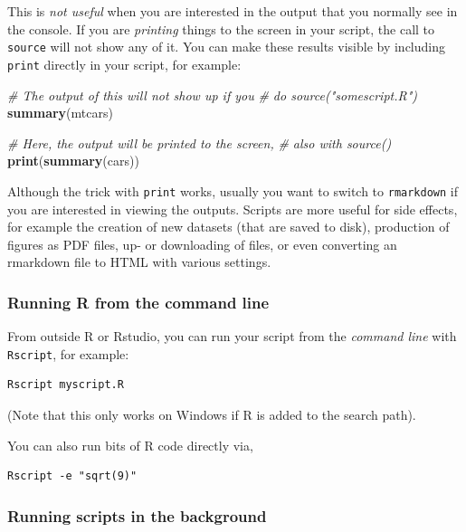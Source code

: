 \documentclass[]{book}
\newenvironment{Shaded}{\begin{snugshade}}{\end{snugshade}}
\newcommand{\CommentTok}[1]{\textcolor[rgb]{0.56,0.35,0.01}{\textit{#1}}}
\newcommand{\KeywordTok}[1]{\textcolor[rgb]{0.13,0.29,0.53}{\textbf{#1}}}
\newcommand{\NormalTok}[1]{#1}
\begin{document}
This is \emph{not useful} when you are interested in the output that you normally see in the console. If you are \emph{printing} things to the screen in your script, the call to \texttt{source} will not show any of it. You can make these results visible by including \texttt{print} directly in your script, for example:

\begin{Shaded}
\begin{Highlighting}[]
\CommentTok{# The output of this will not show up if you }
\CommentTok{# do source("somescript.R")}
\KeywordTok{summary}\NormalTok{(mtcars)}

\CommentTok{# Here, the output will be printed to the screen,}
\CommentTok{# also with source()}
\KeywordTok{print}\NormalTok{(}\KeywordTok{summary}\NormalTok{(cars))}
\end{Highlighting}
\end{Shaded}

Although the trick with \texttt{print} works, usually you want to switch to \texttt{rmarkdown} if you are interested in viewing the outputs. Scripts are more useful for side effects, for example the creation of new datasets (that are saved to disk), production of figures as PDF files, up- or downloading of files, or even converting an rmarkdown file to HTML with various settings.

\hypertarget{running-r-from-the-command-line}{%
\subsubsection{Running R from the command line}\label{running-r-from-the-command-line}}

From outside R or Rstudio, you can run your script from the \emph{command line} with \texttt{Rscript}, for example:

\begin{verbatim}
Rscript myscript.R
\end{verbatim}

(Note that this only works on Windows if R is added to the search path).

You can also run bits of R code directly via,

\begin{verbatim}
Rscript -e "sqrt(9)"
\end{verbatim}

\hypertarget{running-scripts-in-the-background}{%
\subsubsection{Running scripts in the background}\label{running-scripts-in-the-background}}
\end{document}
